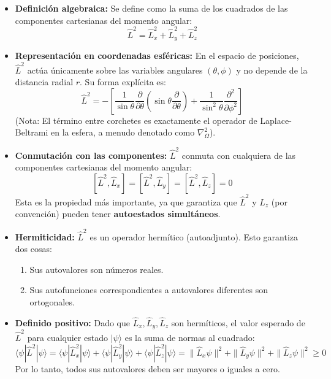 \documentclass[a4paper]{article}
\begin{document}
\begin{itemize}
    \item \textbf{Definición algebraica:} Se define como la suma de los cuadrados de las componentes cartesianas del momento angular:
    $$\hat{L}^2 = \hat{L}_x^2 + \hat{L}_y^2 + \hat{L}_z^2$$
    
    \item \textbf{Representación en coordenadas esféricas:} En el espacio de posiciones, $\hat{L}^2$ actúa únicamente sobre las variables angulares $(\theta, \phi)$ y no depende de la distancia radial $r$. Su forma explícita es:
    $$\hat{L}^2 = -\left[ \frac{1}{\sin\theta} \frac{\partial}{\partial\theta} \left( \sin\theta \frac{\partial}{\partial\theta} \right) + \frac{1}{\sin^2\theta} \frac{\partial^2}{\partial\phi^2} \right]$$
    (Nota: El término entre corchetes es exactamente el operador de Laplace-Beltrami en la esfera, a menudo denotado como $\nabla^2_{\Omega}$).
    
    \item \textbf{Conmutación con las componentes:} $\hat{L}^2$ conmuta con cualquiera de las componentes cartesianas del momento angular:
    $$[\hat{L}^2, \hat{L}_x] = [\hat{L}^2, \hat{L}_y] = [\hat{L}^2, \hat{L}_z] = 0$$
    Esta es la propiedad más importante, ya que garantiza que $\hat{L}^2$ y $\hat{L}_z$ (por convención) pueden tener \textbf{autoestados simultáneos}.
    
    \item \textbf{Hermiticidad:} $\hat{L}^2$ es un operador hermítico (autoadjunto). Esto garantiza dos cosas:
    \begin{enumerate}
        \item Sus autovalores son números reales.
        \item Sus autofunciones correspondientes a autovalores diferentes son ortogonales.
    \end{enumerate}
    
    \item \textbf{Definido positivo:} Dado que $\hat{L}_x, \hat{L}_y, \hat{L}_z$ son hermíticos, el valor esperado de $\hat{L}^2$ para cualquier estado $|\psi\rangle$ es la suma de normas al cuadrado:
    $$\langle \psi | \hat{L}^2 | \psi \rangle = \langle \psi | \hat{L}_x^2 | \psi \rangle + \langle \psi | \hat{L}_y^2 | \psi \rangle + \langle \psi | \hat{L}_z^2 | \psi \rangle = \|\hat{L}_x \psi\|^2 + \|\hat{L}_y \psi\|^2 + \|\hat{L}_z \psi\|^2 \ge 0$$
    Por lo tanto, todos sus autovalores deben ser mayores o iguales a cero.
\end{itemize}
\end{document}
